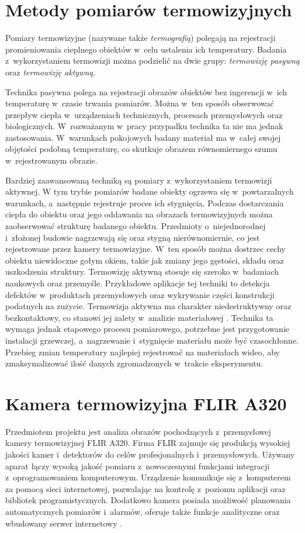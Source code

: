 \section{Metody pomiarów termowizyjnych}
\label{sec:thermovision}
Pomiary termowizyjne (nazywane także \emph{termografią}) polegają na rejestracji 
promieniowania cieplnego obiektów w~celu ustalenia ich temperatury.
Badania z~wykorzystaniem termowizji można podzielić na dwie grupy:
\emph{termowizję pasywną} oraz \emph{termowizję aktywną}.

Technika pasywna polega na rejestracji obrazów obiektów bez ingerencji w~ich
temperaturę w~czasie trwania pomiarów.
Można w~ten sposób obserwować przepływ ciepła w~urządzeniach technicznych,
procesach przemysłowych oraz biologicznych.
W~rozważanym w~pracy przypadku technika ta nie ma jednak zastosowania.
W~warunkach pokojowych badany materiał ma w~całej swojej objętości podobną
temperaturę, co skutkuje obrazem równomiernego szumu w~rejestrowanym obrazie.

Bardziej zaawansowaną techniką są pomiary z~wykorzystaniem termowizji aktywnej.
W tym trybie pomiarów badane obiekty ogrzewa się w~powtarzalnych warunkach,
a~następnie rejestruje proces ich stygnięcia.
Podczas dostarczania ciepła do obiektu oraz jego oddawania na obrazach
termowizyjnych można zaobserwować strukturę badanego obiektu.
Przedmioty o~niejednorodnej i~złożonej budowie nagrzewają się oraz stygną
nierównomiernie, co jest rejestrowane przez kamery termowizyjne.
W~ten sposób można dostrzec cechy obiektu niewidoczne gołym okiem, takie jak 
zmiany jego gęstości, składu oraz uszkodzenia struktury.
Termowizję aktywną stosuje się szeroko w~badaniach naukowych oraz przemyśle.
Przykładowe aplikacje tej techniki to detekcja defektów w~produktach
przemysłowych oraz wykrywanie części konstrukcji podatnych na zużycie.
Termowizja aktywna ma charakter niedestruktywny oraz bezkontaktowy, co stanowi
jej zalety w~analizie materiałowej \cite{ciampa_thermography}.
Technika ta wymaga jednak etapowego procesu pomiarowego, potrzebne jest
przygotowanie instalacji grzewczej, a~nagrzewanie i~stygnięcie materiału może
być czasochłonne.
Przebieg zmian temperatury najlepiej rejestrować na materiałach wideo, aby
zmaksymalizować ilość danych zgromadzonych w~trakcie eksperymentu.

\section{Kamera termowizyjna FLIR A320}
\label{sec:camera}
Przedmiotem projektu jest analiza obrazów pochodzących z~przemysłowej kamery
termowizyjnej FLIR A320.
Firma FLIR zajmuje się produkcją wysokiej jakości kamer i~detektorów do celów
profesjonalnych i~przemysłowych.
Używany aparat łączy wysoką jakość pomiaru z~nowoczesnymi funkcjami integracji
z~oprogramowaniem komputerowym.
Urządzenie komunikuje się z~komputerem za pomocą sieci internetowej, pozwalając
na kontrolę z~poziomu aplikacji oraz bibliotek programistycznych.
Dodatkowo kamera posiada możliwość planowania automatycznych pomiarów i~alarmów,
oferuje także funkcje analityczne oraz wbudowany serwer internetowy
\cite{flir_a32x_manual}.

